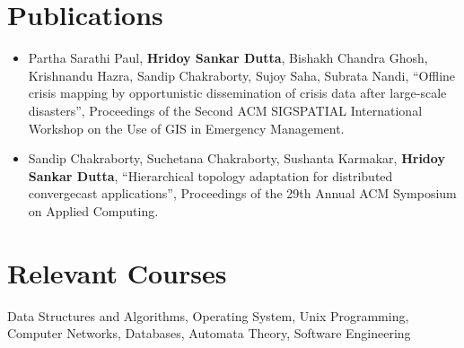 \documentclass[margin, centered]{res}
\begin{document}
\begin{resume}

\section{Publications}
\begin{itemize}[leftmargin=*]
\item Partha Sarathi Paul, \textbf{Hridoy Sankar Dutta}, Bishakh Chandra Ghosh, Krishnandu Hazra, Sandip Chakraborty, Sujoy Saha, Subrata Nandi, ``Offline crisis mapping by opportunistic dissemination of crisis data after large-scale disasters'', Proceedings of the Second ACM SIGSPATIAL International Workshop on the Use of GIS in Emergency Management.
\item Sandip Chakraborty, Suchetana Chakraborty, Sushanta Karmakar, \textbf{Hridoy Sankar Dutta}, ``Hierarchical topology adaptation for distributed convergecast applications'', Proceedings of the 29th Annual ACM Symposium on Applied Computing.
\end{itemize}

\section{Relevant \hspace{2mm} Courses}
Data Structures and Algorithms, Operating System, Unix Programming, Computer Networks, Databases, Automata Theory, Software Engineering


\end{resume}
\end{document}
